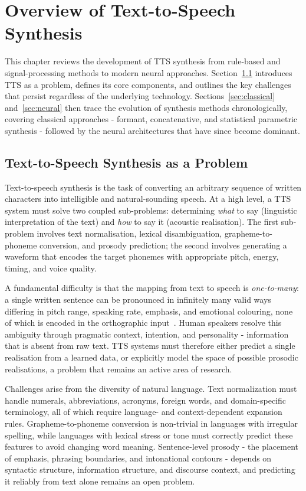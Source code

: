 \documentclass[
         english, %
    monochrome, %
]{VUMIFSEMasterThesis}
\begin{document}
\section{Overview of Text-to-Speech Synthesis}

This chapter reviews the development of TTS synthesis from rule-based and signal-processing methods to modern neural approaches. Section~\ref{sec:tts-overview} introduces TTS as a problem, defines its core components, and outlines the key challenges that persist regardless of the underlying technology. Sections~\ref{sec:classical} and~\ref{sec:neural} then trace the evolution of synthesis methods chronologically, covering classical approaches - formant, concatenative, and statistical parametric synthesis - followed by the neural architectures that have since become dominant.

\subsection{Text-to-Speech Synthesis as a Problem}
\label{sec:tts-overview}

Text-to-speech synthesis is the task of converting an arbitrary sequence of written characters into intelligible and natural-sounding speech. At a high level, a TTS system must solve two coupled sub-problems: determining \emph{what} to say (linguistic interpretation of the text) and \emph{how} to say it (acoustic realisation). The first sub-problem involves text normalisation, lexical disambiguation, grapheme-to-phoneme conversion, and prosody prediction; the second involves generating a waveform that encodes the target phonemes with appropriate pitch, energy, timing, and voice quality.

A fundamental difficulty is that the mapping from text to speech is \emph{one-to-many}: a single written sentence can be pronounced in infinitely many valid ways differing in pitch range, speaking rate, emphasis, and emotional colouring, none of which is encoded in the orthographic input~\cite{wang2017tacotron, ren2021fastspeech}. Human speakers resolve this ambiguity through pragmatic context, intention, and personality - information that is absent from raw text. TTS systems must therefore either predict a single realisation from a learned data, or explicitly model the space of possible prosodic realisations, a problem that remains an active area of research. 

Challenges arise from the diversity of natural language. Text normalization must handle numerals, abbreviations, acronyms, foreign words, and domain-specific terminology, all of which require language- and context-dependent expansion rules. Grapheme-to-phoneme conversion is non-trivial in languages with irregular spelling, while languages with lexical stress or tone must correctly predict these features to avoid changing word meaning. Sentence-level prosody - the placement of emphasis, phrasing boundaries, and intonational contours - depends on syntactic structure, information structure, and discourse context, and predicting it reliably from text alone remains an open problem.
\end{document}
